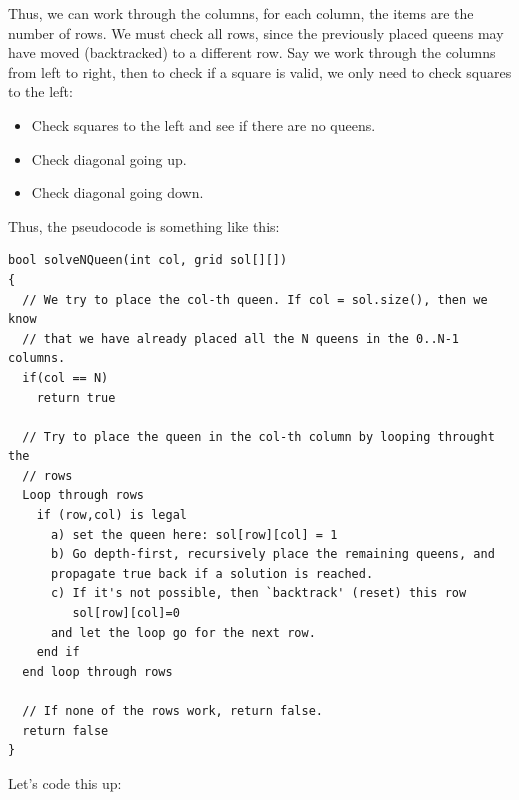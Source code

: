 Thus, we can work through the columns, for each column, the items are the
number of rows. We must check all rows, since the previously placed queens
may have moved (backtracked) to a different row. Say we work through the
columns from left to right, then to check if a square is valid, we only need
to check squares to the left:
\begin{itemize}[noitemsep,topsep=0pt]
\item Check squares to the left and see if there are no queens.
\item Check diagonal going up.
\item Check diagonal going down.
\end{itemize}
Thus, the pseudocode is something like this:
\begin{lstlisting}[style=pseudostyle,numbers=none]
bool solveNQueen(int col, grid sol[][])
{
  // We try to place the col-th queen. If col = sol.size(), then we know
  // that we have already placed all the N queens in the 0..N-1 columns.
  if(col == N)
    return true

  // Try to place the queen in the col-th column by looping throught the
  // rows
  Loop through rows
    if (row,col) is legal
      a) set the queen here: sol[row][col] = 1
      b) Go depth-first, recursively place the remaining queens, and
      propagate true back if a solution is reached.
      c) If it's not possible, then `backtrack' (reset) this row
         sol[row][col]=0
      and let the loop go for the next row.
    end if
  end loop through rows

  // If none of the rows work, return false.
  return false
}
\end{lstlisting}
Let's code this up: 
